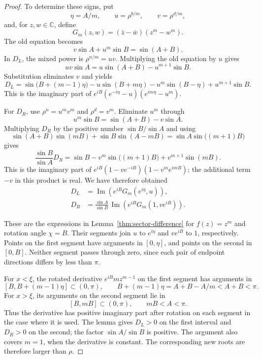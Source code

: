 \documentclass[11pt,a4paper]{article}
\theoremstyle{definition}
\theoremstyle{remark}
\numberwithin{equation}{section}
\begin{document}
\begin{proof}
To determine these signs, put
\[
 \eta=A/m,\qquad u=\rho^{b/m},\qquad v=\rho^{d/m},
\]
and, for $z,w\in\mathbb C$, define
\[
 G_m(z,w)=(\bar z-\bar w)(z^m-w^m).
\]
The old equation becomes
\[
 v\sin A+u^m\sin B=\sin(A+B).
\]
In $D_L$, the mixed power is $\rho^{n/m}=uv$. Multiplying the old equation by $u$ gives
\[
 uv\sin A=u\sin(A+B)-u^{m+1}\sin B.
\]
Substitution eliminates $v$ and yields
\[
 D_L=\sin\bigl(B+(m-1)\eta\bigr)-u\sin(B+m\eta)
       -u^m\sin(B-\eta)+u^{m+1}\sin B.
\]
This is the imaginary part of
$e^{iB}(e^{-i\eta}-u)(e^{im\eta}-u^m)$.

For $D_R$, use $\rho^n=u^mv^m$ and $\rho^d=v^m$. Eliminate $u^m$ through
\[
 u^m\sin B=\sin(A+B)-v\sin A.
\]
Multiplying $D_R$ by the positive number $\sin B/\sin A$ and using
\[
 \sin(A+B)\sin(mB)+\sin B\sin(A-mB)
 =\sin A\sin\bigl((m+1)B\bigr)
\]
gives
\[
 \frac{\sin B}{\sin A}D_R
 =\sin B-v^m\sin\bigl((m+1)B\bigr)+v^{m+1}\sin(mB).
\]
This is the imaginary part of
$e^{iB}(1-ve^{-iB})(1-v^me^{imB})$; the additional term $-v$ in this product is real. We have therefore obtained
\begin{equation}\label{eq:mediant-differences}
 \begin{split}
 D_L&=\operatorname{Im}\!\left(e^{iB}G_m(e^{i\eta},u)\right),\\
 D_R&=\frac{\sin A}{\sin B}\,
       \operatorname{Im}\!\left(e^{iB}G_m(1,ve^{iB})\right).
 \end{split}
\end{equation}

These are the expressions in Lemma~\ref{thm:sector-difference} for $f(z)=z^m$ and rotation angle $\chi=B$. Their segments join $u$ to $e^{i\eta}$ and $ve^{iB}$ to $1$, respectively. Points on the first segment have arguments in $[0,\eta]$, and points on the second in $[0,B]$. Neither segment passes through zero, since each pair of endpoint directions differs by less than $\pi$.

For $x<\xi$, the rotated derivative $e^{iB}mz^{m-1}$ on the first segment has arguments in
\[
 [B,B+(m-1)\eta]\subset(0,\pi),
 \qquad B+(m-1)\eta=A+B-A/m<A+B<\pi.
\]
For $x>\xi$, its arguments on the second segment lie in
\[
 [B,mB]\subset(0,\pi),
 \qquad mB<A<\pi.
\]
Thus the derivative has positive imaginary part after rotation on each segment in the case where it is used. The lemma gives $D_L>0$ on the first interval and $D_R>0$ on the second; the factor $\sin A/\sin B$ is positive. The argument also covers $m=1$, when the derivative is constant. The corresponding new roots are therefore larger than $\rho$.


\end{proof}
\end{document}
